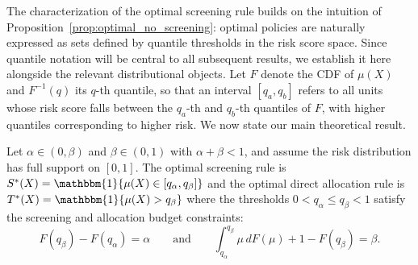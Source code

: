 The characterization of the optimal screening rule builds on the intuition of Proposition~\ref{prop:optimal_no_screening}: optimal policies are naturally expressed as sets defined by quantile thresholds in the risk score space. Since quantile notation will be central to all subsequent results, we establish it here alongside the relevant distributional objects. Let $F$ denote the CDF of $\mu(X)$ and $F^{-1}(q)$ its $q$-th quantile, so that an interval $[q_a, q_b]$ refers to all units whose risk score falls between the $q_a$-th and $q_b$-th quantiles of $F$, with higher quantiles corresponding to higher risk. We now state our main theoretical result.


\begin{theorem}
\label{thm:optimal_screening}
Let $\alpha \in (0,\beta)$ and $\beta \in (0,1)$ with $\alpha + \beta < 1$, and assume the risk distribution has full support on $[0,1]$. The optimal screening rule is $S^*(X) = \mathbbm{1}\{\mu(X) \in [q_\alpha, q_\beta]\}$
and the optimal direct allocation rule is $
    T^*(X) = \mathbbm{1}\{\mu(X) > q_\beta\}$
where the thresholds $0 < q_\alpha \leq q_\beta < 1$ satisfy the screening and allocation budget constraints:
\begin{equation}
F(q_\beta) - F(q_\alpha) = \alpha \qquad  \text{and} \qquad \int_{q_\alpha}^{q_\beta} \mu \, dF(\mu) + 1 - F(q_\beta) = \beta.
\label{eq:budget_constraints}
\end{equation}
\end{theorem}


